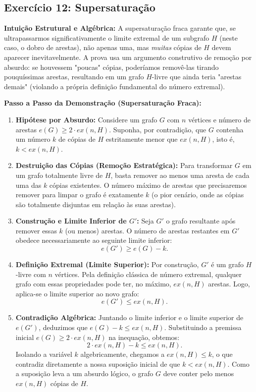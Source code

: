 \documentclass[11pt, a4paper]{article}
\begin{document}
\subsection*{Exercício 12: Supersaturação}
\textbf{Intuição Estrutural e Algébrica:} A supersaturação fraca garante que, se ultrapassarmos significativamente o limite extremal de um subgrafo $H$ (neste caso, o dobro de arestas), não apenas uma, mas \textit{muitas} cópias de $H$ devem aparecer inevitavelmente. A prova usa um argumento construtivo de remoção por absurdo: se houvessem "poucas" cópias, poderíamos removê-las tirando pouquíssimas arestas, resultando em um grafo $H$-livre que ainda teria "arestas demais" (violando a própria definição fundamental do número extremal).

\textbf{Passo a Passo da Demonstração (Supersaturação Fraca):}
\begin{enumerate}
    \item \textbf{Hipótese por Absurdo:} Considere um grafo $G$ com $n$ vértices e número de arestas $e(G) \ge 2 \cdot ex(n, H)$. Suponha, por contradição, que $G$ contenha um número $k$ de cópias de $H$ estritamente menor que $ex(n, H)$, isto é, $k < ex(n, H)$.
    \item \textbf{Destruição das Cópias (Remoção Estratégica):} Para transformar $G$ em um grafo totalmente livre de $H$, basta remover ao menos uma aresta de cada uma das $k$ cópias existentes. O número máximo de arestas que precisaremos remover para limpar o grafo é exatamente $k$ (o pior cenário, onde as cópias são totalmente disjuntas em relação às suas arestas).
    \item \textbf{Construção e Limite Inferior de $G'$:} Seja $G'$ o grafo resultante após remover essas $k$ (ou menos) arestas. O número de arestas restantes em $G'$ obedece necessariamente ao seguinte limite inferior: 
    \[ e(G') \ge e(G) - k. \]
    \item \textbf{Definição Extremal (Limite Superior):} Por construção, $G'$ é um grafo $H$-livre com $n$ vértices. Pela definição clássica de número extremal, qualquer grafo com essas propriedades pode ter, no máximo, $ex(n, H)$ arestas. Logo, aplica-se o limite superior ao novo grafo: 
    \[ e(G') \le ex(n, H). \]
    \item \textbf{Contradição Algébrica:} Juntando o limite inferior e o limite superior de $e(G')$, deduzimos que $e(G) - k \le ex(n, H)$. Substituindo a premissa inicial $e(G) \ge 2 \cdot ex(n, H)$ na inequação, obtemos:
    \[ 2 \cdot ex(n, H) - k \le ex(n, H). \]
    Isolando a variável $k$ algebricamente, chegamos a $ex(n, H) \le k$, o que contradiz diretamente a nossa suposição inicial de que $k < ex(n, H)$. Como a suposição leva a um absurdo lógico, o grafo $G$ deve conter pelo menos $ex(n, H)$ cópias de $H$.
\end{enumerate}
\end{document}

